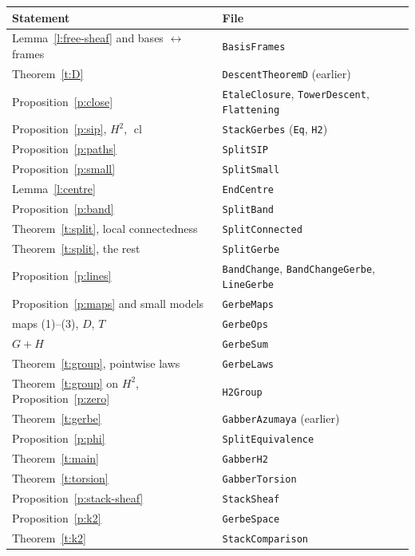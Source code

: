 \documentclass[11pt]{amsart}
\theoremstyle{definition}
\theoremstyle{remark}
\newcommand{\cl}{\operatorname{cl}}
\newcommand{\code}[1]{\texttt{#1}}
\begin{document}
\smallskip
\begin{center}
\begin{tabular}{ll}
Statement & File\\\hline
Lemma~\ref{l:free-sheaf} and bases $\leftrightarrow$ frames & \code{BasisFrames}\\
Theorem~\ref{t:D} & \code{DescentTheoremD} (earlier)\\
Proposition~\ref{p:close} & \code{EtaleClosure}, \code{TowerDescent}, \code{Flattening}\\
Proposition~\ref{p:sip}, $H^2$, $\cl$ & \code{StackGerbes} (\code{Eq}, \code{H2})\\
Proposition~\ref{p:paths} & \code{SplitSIP}\\
Proposition~\ref{p:small} & \code{SplitSmall}\\
Lemma~\ref{l:centre} & \code{EndCentre}\\
Proposition~\ref{p:band} & \code{SplitBand}\\
Theorem~\ref{t:split}, local connectedness & \code{SplitConnected}\\
Theorem~\ref{t:split}, the rest & \code{SplitGerbe}\\
Proposition~\ref{p:lines} & \code{BandChange}, \code{BandChangeGerbe}, \code{LineGerbe}\\
Proposition~\ref{p:maps} and small models & \code{GerbeMaps}\\
maps (1)--(3), $D$, $T$ & \code{GerbeOps}\\
$G+H$ & \code{GerbeSum}\\
Theorem~\ref{t:group}, pointwise laws & \code{GerbeLaws}\\
Theorem~\ref{t:group} on $H^2$, Proposition~\ref{p:zero} & \code{H2Group}\\
Theorem~\ref{t:gerbe} & \code{GabberAzumaya} (earlier)\\
Proposition~\ref{p:phi} & \code{SplitEquivalence}\\
Theorem~\ref{t:main} & \code{GabberH2}\\
Theorem~\ref{t:torsion} & \code{GabberTorsion}\\
Proposition~\ref{p:stack-sheaf} & \code{StackSheaf}\\
Proposition~\ref{p:k2} & \code{GerbeSpace}\\
Theorem~\ref{t:k2} & \code{StackComparison}
\end{tabular}
\end{center}
\end{document}

